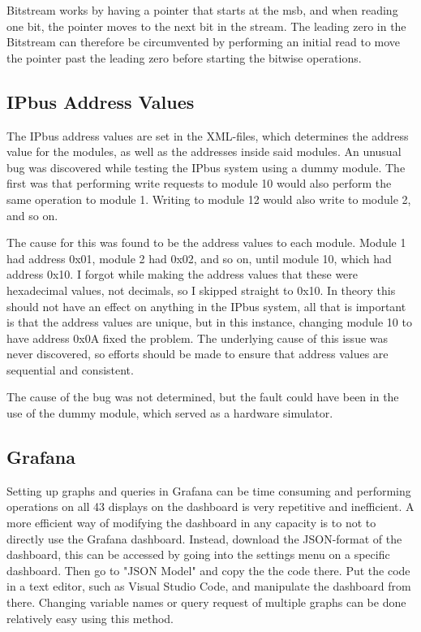 \documentclass[main.tex]{subfiles}
\begin{document}
Bitstream works by having a pointer that starts at the \gls{msb}, and when reading one bit, the pointer moves to the next bit in the stream. The leading zero in the Bitstream can therefore be circumvented by performing an initial read to move the pointer past the leading zero before starting the bitwise operations.

\subsection{IPbus Address Values}

The IPbus address values are set in the XML-files, which determines the address value for the modules, as well as the addresses inside said modules. An unusual bug was discovered while testing the IPbus system using a dummy module. The first was that performing write requests to module 10 would also perform the same operation to module 1. Writing to module 12 would also write to module 2, and so on.

The cause for this was found to be the address values to each module. Module 1 had address 0x01, module 2 had 0x02, and so on, until module 10, which had address 0x10. I forgot while making the address values that these were hexadecimal values, not decimals, so I skipped straight to 0x10. In theory this should not have an effect on anything in the IPbus system, all that is important is that the address values are unique, but in this instance, changing module 10 to have address 0x0A fixed the problem. The underlying cause of this issue was never discovered, so efforts should be made to ensure that address values are sequential and consistent.

The cause of the bug was not determined, but the fault could have been in the use of the dummy module, which served as a hardware simulator.

\subsection{Grafana}

Setting up graphs and queries in Grafana can be time consuming and performing operations on all 43 displays on the dashboard is very repetitive and inefficient. A more efficient way of modifying the dashboard in any capacity is to not to directly use the Grafana dashboard. Instead, download the JSON-format of the dashboard, this can be accessed by going into the settings menu on a specific dashboard. Then go to "JSON Model" and copy the the code there. Put the code in a text editor, such as Visual Studio Code, and manipulate the dashboard from there. Changing variable names or query request of multiple graphs can be done relatively easy using this method.
\end{document}
